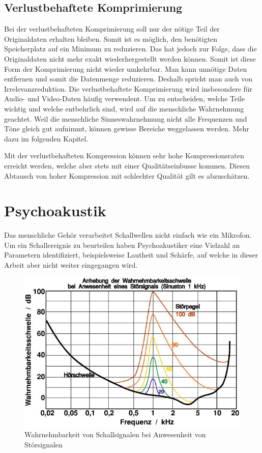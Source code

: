\begin{refsection}
\subsection{Verlustbehaftete Komprimierung}
Bei der verlustbehafteten Komprimierung soll nur der nötige Teil der Originaldaten erhalten bleiben.
Somit ist es möglich, den benötigten Speicherplatz auf ein Minimum zu reduzieren.
Das hat jedoch zur Folge, dass die Originaldaten nicht mehr exakt wiederhergestellt werden können. 
Somit ist diese Form der Komprimierung nicht wieder umkehrbar.
Man kann unnötige Daten entfernen und somit die Datenmenge reduzieren.
Deshalb spricht man auch von Irrelevanzreduktion.
Die verlustbehaftete Komprimierung wird insbesondere für Audio- und Video-Daten häufig verwendent.
Um zu entscheiden, welche Teile wichtig und welche entbehrlich sind, wird auf die menschliche Wahrnehmung geachtet.
Weil die menschliche Sinneswahrnehmung nicht alle Frequenzen und Töne gleich gut aufnimmt, können gewisse Bereiche weggelassen werden.
Mehr dazu im folgenden Kapitel.

Mit der verlustbehafteten Kompression können sehr hohe Kompressionsraten erreicht werden, welche aber stets mit einer Qualitätseinbusse kommen.
Diesen Abtausch von hoher Kompression mit schlechter Qualität gilt es abzuschätzen.

\section{Psychoakustik}
\label{chapter:Psychoakustik}
Das menschliche Gehör verarbeitet Schallwellen nicht einfach wie ein Mikrofon.
Um ein Schallereignis zu beurteilen haben Psychoakustiker eine Vielzahl an Parametern identifiziert, beispielsweise Lautheit und Schärfe, auf welche in dieser Arbeit aber nicht weiter eingegangen wird.

\begin{figure}
	\centering
	\includegraphics[width=0.6\linewidth]{papers/compress/Bilder/Akustik_Mithoerschwelle2}
	\caption{Wahrnehmbarkeit von Schallsignalen bei Anwesenheit von Störsignalen \cite{skript:Akustik2}}
	\label{fig:Wahrnehmbarkeitsschwelle}
\end{figure}


\end{refsection}
